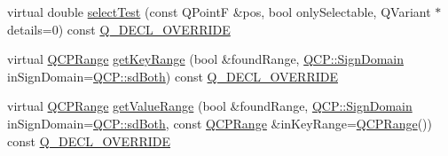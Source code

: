 \begin{DoxyCompactItemize}
\item 
virtual double \hyperlink{class_q_c_p_statistical_box_a1607fa92f829c631107c20ccb2d70a6d}{select\+Test} (const Q\+PointF \&pos, bool only\+Selectable, Q\+Variant $\ast$details=0) const \hyperlink{qcustomplot_8h_a42cc5eaeb25b85f8b52d2a4b94c56f55}{Q\+\_\+\+D\+E\+C\+L\+\_\+\+O\+V\+E\+R\+R\+I\+DE}
\item 
virtual \hyperlink{class_q_c_p_range}{Q\+C\+P\+Range} \hyperlink{class_q_c_p_statistical_box_a77d2d13301dfe60c13adfaa17fc1802f}{get\+Key\+Range} (bool \&found\+Range, \hyperlink{namespace_q_c_p_afd50e7cf431af385614987d8553ff8a9}{Q\+C\+P\+::\+Sign\+Domain} in\+Sign\+Domain=\hyperlink{namespace_q_c_p_afd50e7cf431af385614987d8553ff8a9aa38352ef02d51ddfa4399d9551566e24}{Q\+C\+P\+::sd\+Both}) const \hyperlink{qcustomplot_8h_a42cc5eaeb25b85f8b52d2a4b94c56f55}{Q\+\_\+\+D\+E\+C\+L\+\_\+\+O\+V\+E\+R\+R\+I\+DE}
\item 
virtual \hyperlink{class_q_c_p_range}{Q\+C\+P\+Range} \hyperlink{class_q_c_p_statistical_box_ab3388a21d0c2e86fbc0cba9c06ceb49b}{get\+Value\+Range} (bool \&found\+Range, \hyperlink{namespace_q_c_p_afd50e7cf431af385614987d8553ff8a9}{Q\+C\+P\+::\+Sign\+Domain} in\+Sign\+Domain=\hyperlink{namespace_q_c_p_afd50e7cf431af385614987d8553ff8a9aa38352ef02d51ddfa4399d9551566e24}{Q\+C\+P\+::sd\+Both}, const \hyperlink{class_q_c_p_range}{Q\+C\+P\+Range} \&in\+Key\+Range=\hyperlink{class_q_c_p_range}{Q\+C\+P\+Range}()) const \hyperlink{qcustomplot_8h_a42cc5eaeb25b85f8b52d2a4b94c56f55}{Q\+\_\+\+D\+E\+C\+L\+\_\+\+O\+V\+E\+R\+R\+I\+DE}
\end{DoxyCompactItemize}
